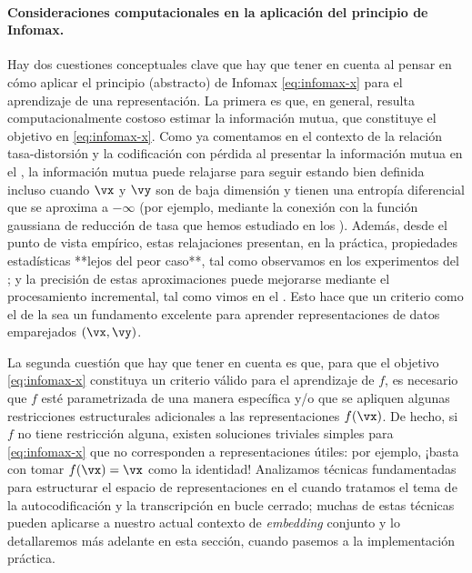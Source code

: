 \documentclass[../../book-main_es.tex]{subfiles}
\begin{document}
\paragraph{Consideraciones computacionales en la aplicación del principio de Infomax.}

Hay dos cuestiones conceptuales clave que hay que tener en cuenta al pensar en cómo 
aplicar el principio (abstracto) de Infomax \eqref{eq:infomax-x} para el aprendizaje
de una representación. La primera es que, en general, resulta computacionalmente costoso
estimar la información mutua, que constituye el objetivo en
\eqref{eq:infomax-x}.
Como ya comentamos en el contexto de la relación tasa-distorsión y la codificación con pérdida
al presentar
la información mutua en el , la información mutua
puede relajarse para seguir estando bien definida incluso cuando $\vx$ y $\vy$ son
de baja dimensión y tienen una entropía diferencial que se aproxima a $-\infty$ (por ejemplo, mediante
    la conexión con la función gaussiana de reducción de tasa que hemos estudiado en los
).
Además, desde el punto de vista empírico, estas relajaciones presentan, en la práctica, 
propiedades estadísticas **lejos del peor caso**, tal como observamos en los experimentos del
; y la precisión de estas aproximaciones puede
mejorarse mediante el procesamiento incremental, tal como vimos en el .
Esto hace que un criterio como el de la  sea un fundamento excelente para
aprender representaciones de datos emparejados $(\vx, \vy)$.

La segunda cuestión que hay que tener en cuenta es que, para que el objetivo \eqref{eq:infomax-x}
constituya un criterio válido para el aprendizaje de $f$, es necesario que $f$
esté parametrizada de una manera específica y/o que se apliquen algunas restricciones
estructurales adicionales a las representaciones $f(\vx)$. De hecho, si $f$
no tiene restricción alguna, existen soluciones triviales simples para
\eqref{eq:infomax-x} que no corresponden a representaciones útiles: por
ejemplo, ¡basta con tomar $f(\vx) = \vx$ como la identidad!
Analizamos técnicas fundamentadas para estructurar el espacio de representaciones en el
 cuando tratamos el tema de la autocodificación y la transcripción en
bucle cerrado; muchas de estas técnicas pueden aplicarse a nuestro
actual contexto de \textit{embedding} conjunto y lo detallaremos más adelante en esta
sección, cuando pasemos a la implementación práctica.
\end{document}
